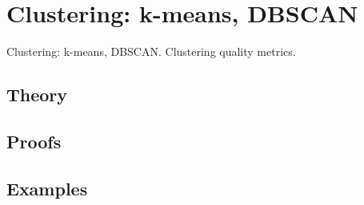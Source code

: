 
\section{Clustering: k-means, DBSCAN}
\label{sec:1.4.06-clustering}

\begin{ticket}
Clustering: k-means, DBSCAN. Clustering quality metrics.
\end{ticket}

\subsection*{Theory}

\subsection*{Proofs}

\subsection*{Examples}
